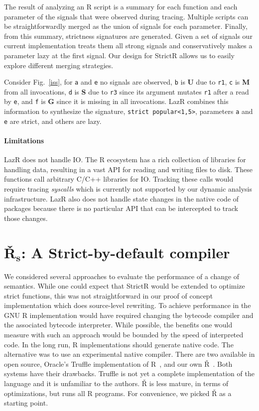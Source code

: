 \documentclass[review,screen,acmsmall]{acmart}
\renewcommand{\c}[1]{\lstinline |#1|\xspace}
\newcommand{\strictr}{{\sf StrictR}\xspace}
\newcommand{\lazr}{{\sf LazR}\xspace}
\renewcommand{\Rsh}{{\sf\v R}\xspace}
\begin{document}
The result of analyzing an R script is a summary for each function and each
parameter of the signals that were observed during tracing. Multiple scripts can
be straightforwardly merged as the union of signals for each parameter. Finally,
from this summary, strictness signatures are generated. Given a set of signals
our current implementation treats them all strong signals and conservatively
makes a parameter lazy at the first signal. Our design for \strictr allows us to
easily explore different merging strategies.


Consider Fig.~\ref{iss}, for \c a and \c e no signals are observed, \c b is
\textbf{U} due to \c{r1}, \c c is \textbf{M} from all invocations, \c d is
\textbf{S} due to \c{r3} since its argument mutates \c{r1} after a read by \c e,
and \c f is \textbf{G} since it is missing in all invocations. \lazr combines
this information to synthesize the signature, \texttt{strict popular<1,5>},
parameters \c a and \c e are strict, and others are lazy.


\paragraph{Limitations}
\lazr does not handle IO. The R ecosystem has a rich collection of libraries for
handling data, resulting in a vast API for reading and writing files to disk.
These functions call arbitrary C/C++ libraries for IO. Tracking these calls
would require tracing \emph{syscalls} which is currently not supported by our
dynamic analysis infrastructure. \lazr also does not handle state changes in the
native code of packages because there is no particular API that can be
intercepted to track those changes.

\section{\v R$_{\mathbf s}$: A Strict-by-default compiler}\label{sec:rsh1}

We considered several approaches to evaluate the performance of a change of
semantics. While one could expect that \strictr would be extended to optimize
strict functions, this was not straightforward in our proof of concept
implementation which does source-level rewriting. To achieve performance in the
GNU R implementation would have required changing the bytecode compiler and the
associated bytecode interpreter. While possible, the benefits one would measure
with such an approach would be bounded by the speed of interpreted code. In the long
run, R implementations should generate native code. The alternative was to use
an experimental native compiler. There are two available in open source,
Oracle's Truffle implementation of R~\cite{Stadler16}, and our own
\Rsh~\cite{dls19}. Both systems have their drawbacks. Truffle is not yet a
complete implementation of the language and it is unfamiliar to the authors.
\Rsh is less mature, in terms of optimizations, but runs all R programs. For
convenience, we picked \Rsh as a starting point.
\end{document}
